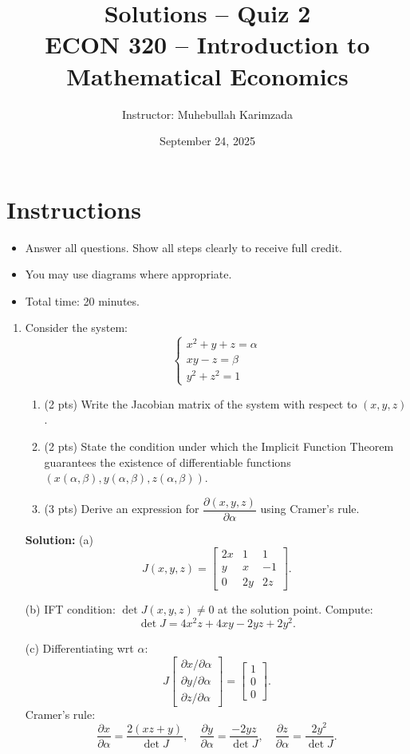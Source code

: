 \documentclass[12pt]{article}
\title{Solutions -- Quiz 2\\ \vspace{10pt}
\large ECON 320 -- Introduction to Mathematical Economics}
\author{Instructor: Muhebullah Karimzada}
\date{September 24, 2025}
\begin{document}
\maketitle

\section*{Instructions}
\begin{itemize}
    \item Answer all questions. Show all steps clearly to receive full credit.
    \item You may use diagrams where appropriate.
    \item Total time: 20 minutes.
\end{itemize}

\hrulefill
\begin{enumerate}


\item 
Consider the system:
\[
\begin{cases}
x^2 + y + z = \alpha \\
xy - z = \beta \\
y^2 + z^2 = 1
\end{cases}
\]
\begin{enumerate}[label=(\alph*),topsep=2pt,itemsep=2pt]
\item (2 pts) Write the Jacobian matrix of the system with respect to $(x,y,z)$.  
\item (2 pts) State the condition under which the Implicit Function Theorem guarantees the existence of differentiable functions $(x(\alpha,\beta), y(\alpha,\beta), z(\alpha,\beta))$.  
\item (3 pts) Derive an expression for $\dfrac{\partial (x,y,z)}{\partial \alpha}$ using Cramer’s rule.  
\end{enumerate}

\textbf{Solution:}  
(a) 
\[
J(x,y,z)=
\begin{bmatrix}
2x & 1 & 1\\
y  & x & -1\\
0  & 2y & 2z
\end{bmatrix}.
\]

(b) IFT condition: $\det J(x,y,z)\neq 0$ at the solution point. Compute:
\[
\det J=4x^2z+4xy-2yz+2y^2.
\]

(c) Differentiating wrt $\alpha$: 
\[
J
\begin{bmatrix}
\partial x/\partial\alpha\\[2pt]
\partial y/\partial\alpha\\[2pt]
\partial z/\partial\alpha
\end{bmatrix}
=
\begin{bmatrix}
1\\0\\0
\end{bmatrix}.
\]
Cramer’s rule:
\[
\frac{\partial x}{\partial\alpha}=\frac{2(xz+y)}{\det J},\quad
\frac{\partial y}{\partial\alpha}=\frac{-2yz}{\det J},\quad
\frac{\partial z}{\partial\alpha}=\frac{2y^2}{\det J}.
\]




\end{enumerate}
\end{document}
